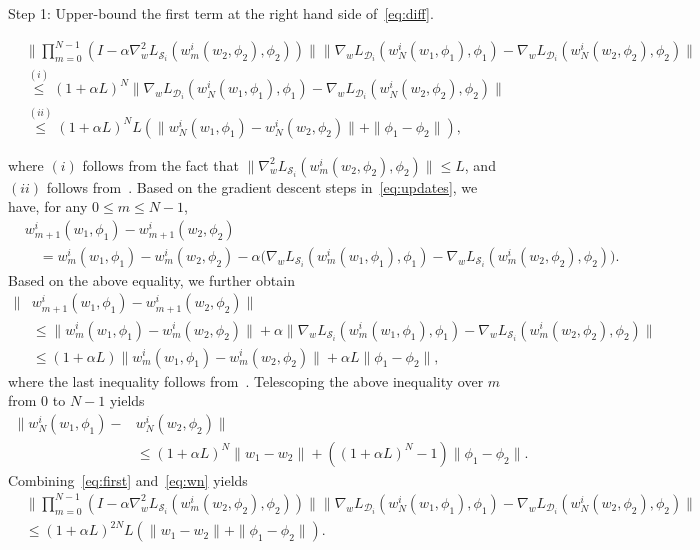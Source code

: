 \documentclass{osudissert96}
\begin{document}
{Step 1: Upper-bound the first term at the right hand side of~\cref{eq:diff}.}
\begin{small}
\begin{align}\label{eq:first}
&\Big\|\prod_{m=0}^{N-1}(I - \alpha \nabla_w^2L_{\mathcal{S}_i}(w_{m}^i(w_2,\phi_2),\phi_2)) \Big\|\Big\|\nabla_{w} L_{\mathcal{D}_i} (w_{N}^i(w_1,\phi_1),\phi_1)-\nabla_{w} L_{\mathcal{D}_i} (w_{N}^i(w_2,\phi_2),\phi_2)\Big\| \nonumber
\\&\overset{(i)}\leq (1+\alpha L)^N \Big\|\nabla_{w} L_{\mathcal{D}_i} (w_{N}^i(w_1,\phi_1),\phi_1)-\nabla_{w} L_{\mathcal{D}_i} (w_{N}^i(w_2,\phi_2),\phi_2)\Big\|\nonumber
\\&\overset{(ii)}\leq (1+\alpha L)^N L(\|w_{N}^i(w_1,\phi_1)-w_{N}^i(w_2,\phi_2)\|+\|\phi_1-\phi_2\|),
\end{align}
\end{small}
\hspace{-0.12cm}  where $(i)$ follows from the fact that $\| \nabla_w^2L_{\mathcal{S}_i}(w_{m}^i(w_2,\phi_2),\phi_2)\|\leq L$, and $(ii)$ follows from~. Based on the gradient descent steps in~\cref{eq:updates}, we have, for any $0\leq m\leq N-1$,  
  \begin{align}
 & w_{m+1}^i(w_1,\phi_1) - w_{m+1}^i(w_2,\phi_2)  \nonumber
 \\ &\quad= w_{m}^i(w_1,\phi_1) -w_{m}^i(w_2,\phi_2) - \alpha\big(\nabla_{w} L_{\mathcal{S}_i} (w_{m}^i(w_1,\phi_1),\phi_1) -\nabla_{w} L_{\mathcal{S}_i} (w_{m}^i(w_2,\phi_2),\phi_2)\big).\nonumber
  \end{align}
Based on the above equality, we further obtain 
\begin{align*}
\|&w_{m+1}^i(w_1,\phi_1) - w_{m+1}^i(w_2,\phi_2)\|
\\&\leq \|w_{m}^i(w_1,\phi_1) -w_{m}^i(w_2,\phi_2) \| + \alpha \|\nabla_{w} L_{\mathcal{S}_i} (w_{m}^i(w_1,\phi_1),\phi_1) -\nabla_{w} L_{\mathcal{S}_i} (w_{m}^i(w_2,\phi_2),\phi_2)\| \nonumber 
\\&\leq(1+\alpha L)\|w_{m}^i(w_1,\phi_1) -w_{m}^i(w_2,\phi_2) \|  + \alpha L \|\phi_1-\phi_2\|,\nonumber
\end{align*}
where the last inequality follows from~.
Telescoping the above inequality over $m$ from $0$ to $N-1$ yields
\begin{align}\label{eq:wn}
\|w_{N}^i(w_1,\phi_1) - &w_{N}^i(w_2,\phi_2)\|  \nonumber
\\&\leq (1+\alpha L)^N \|w_1-w_2\| + ((1+\alpha L)^N-1)\|\phi_1-\phi_2\|.
\end{align}
Combining~\cref{eq:first} and~\cref{eq:wn} yields
\begin{align}\label{upb1}
&\Big\|\prod_{m=0}^{N-1}(I - \alpha \nabla_w^2L_{\mathcal{S}_i}(w_{m}^i(w_2,\phi_2),\phi_2)) \Big\|\Big\|\nabla_{w} L_{\mathcal{D}_i} (w_{N}^i(w_1,\phi_1),\phi_1)-\nabla_{w} L_{\mathcal{D}_i} (w_{N}^i(w_2,\phi_2),\phi_2)\Big\| \nonumber
\\&\leq (1+\alpha L)^{2N} L(\|w_1-w_2\|+\|\phi_1-\phi_2\|).
\end{align}
\end{document}
